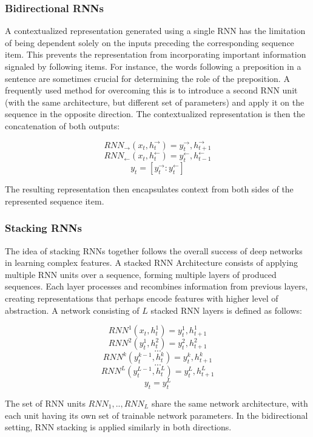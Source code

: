 \subsubsection{Bidirectional RNNs}

A contextualized representation generated using a single RNN has the limitation of being dependent solely on the inputs preceding the corresponding sequence item. This prevents the representation from incorporating important information signaled by following items. For instance, the words following a preposition in a sentence are sometimes crucial for determining the role of the preposition. A frequently used method for overcoming this is to introduce a second RNN unit (with the same architecture, but different set of parameters) and apply it on the sequence in the opposite direction. The contextualized representation is then the concatenation of both outputs:

$$ RNN_{\rightarrow}(x_t, h^{\rightarrow}_{t}) = y^{\rightarrow}_t,h^{\rightarrow}_{t + 1} $$
$$ RNN_{\leftarrow}(x_t, h^{\leftarrow}_{t}) = y^{\leftarrow}_t,h^{\leftarrow}_{t - 1} $$
$$ y_t = [y^{\rightarrow}_t:y^{\leftarrow}_t] $$

The resulting representation then encapsulates context from both sides of the represented sequence item.

\subsubsection{Stacking RNNs}

The idea of stacking RNNs together follows the overall success of deep networks in learning complex features. A stacked RNN Architecture consists of applying multiple RNN units over a sequence, forming multiple layers of produced sequences. Each layer processes and recombines information from previous layers, creating representations that perhaps encode features with higher level of abstraction. A network consisting of $L$ stacked RNN layers is defined as follows:

$$ RNN^1(x_t, h^1_t) = y^1_t, h^1_{t+1} $$
$$ RNN^2(y^1_t, h^2_t) = y^2_t, h^2_{t+1} $$
$$ ... $$
$$ RNN^k(y^{k-1}_t, h^k_t) = y^k_t, h^k_{t+1} $$
$$ ... $$
$$ RNN^L(y^{L-1}_t, h^L_t) = y^L_t, h^L_{t+1} $$
$$ y_t = y^L_t $$

The set of RNN units $RNN_1,..,RNN_L$ share the same network architecture, with each unit having its own set of trainable network parameters. In the bidirectional setting, RNN stacking is applied similarly in both directions.

